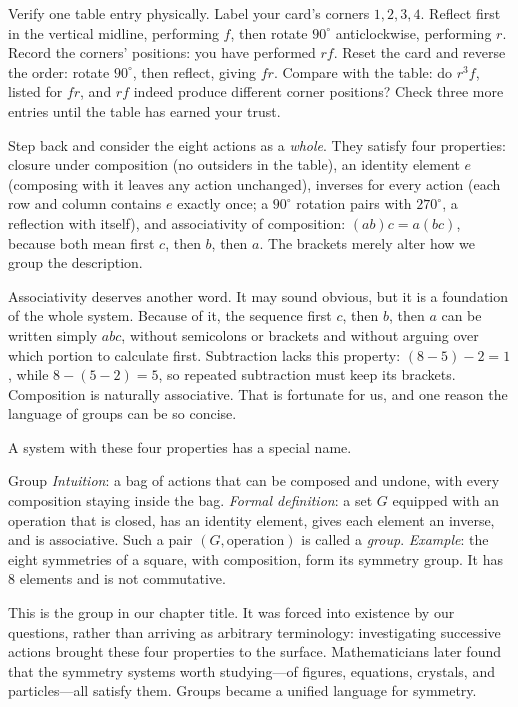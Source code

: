 \begin{shiyan}
Verify one table entry physically. Label your card's corners $1,2,3,4$. Reflect first in the vertical midline, performing $f$, then rotate $90^\circ$ anticlockwise, performing $r$. Record the corners' positions: you have performed $rf$. Reset the card and reverse the order: rotate $90^\circ$, then reflect, giving $fr$. Compare with the table: do $r^3f$, listed for $fr$, and $rf$ indeed produce different corner positions? Check three more entries until the table has earned your trust.
\end{shiyan}

Step back and consider the eight actions as a \emph{whole}. They satisfy four properties: closure under composition (no outsiders in the table), an identity element $e$ (composing with it leaves any action unchanged), inverses for every action (each row and column contains $e$ exactly once; a $90^\circ$ rotation pairs with $270^\circ$, a reflection with itself), and associativity of composition: $(ab)c=a(bc)$, because both mean first $c$, then $b$, then $a$. The brackets merely alter how we group the description.

Associativity deserves another word. It may sound obvious, but it is a foundation of the whole system. Because of it, the sequence first $c$, then $b$, then $a$ can be written simply $abc$, without semicolons or brackets and without arguing over which portion to calculate first. Subtraction lacks this property: $(8-5)-2=1$, while $8-(5-2)=5$, so repeated subtraction must keep its brackets. Composition is naturally associative. That is fortunate for us, and one reason the language of groups can be so concise.

A system with these four properties has a special name.

\begin{shuyu}{Group}
\emph{Intuition}: a bag of actions that can be composed and undone, with every composition staying inside the bag. \emph{Formal definition}: a set $G$ equipped with an operation that is closed, has an identity element, gives each element an inverse, and is associative. Such a pair $(G,\text{operation})$ is called a \emph{group}. \emph{Example}: the eight symmetries of a square, with composition, form its symmetry group. It has $8$ elements and is not commutative.
\end{shuyu}

This is the group in our chapter title. It was forced into existence by our questions, rather than arriving as arbitrary terminology: investigating successive actions brought these four properties to the surface. Mathematicians later found that the symmetry systems worth studying---of figures, equations, crystals, and particles---all satisfy them. Groups became a unified language for symmetry.

